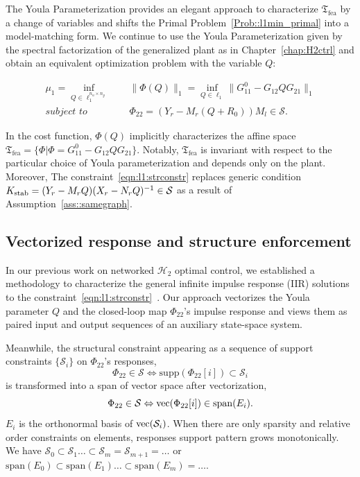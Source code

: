 The Youla Parameterization provides an elegant approach to characterize $\mathfrak{T}_{\mathrm{fea}}$ by a change of variables and shifts the Primal Problem~\ref{Prob::l1min_primal} into a model-matching form. We continue to use the Youla Parameterization given by the spectral factorization of the generalized plant as in Chapter~\ref{chap:H2ctrl} and obtain an equivalent optimization problem with the variable \(Q\):
\begin{opt}\label{Prob::l1minafterpara}
\begin{subequations}
\begin{align} 
\mu_1 = \underset{Q\in\ell_1^{n_u\times n_y}}{\inf}\ \quad &\|\Phi(Q)\|_1=\underset{Q\in\ell_1}{\inf} \|G_{11}^0 - G_{12} Q G_{21}\|_1 \\
\textit{subject to} \quad &
\Phi_{22} = (Y_r - M_r (Q + R_0)) M_l\in\mathcal{S}. \label{eqn:l1:strconstr}
\end{align}
\end{subequations}
\end{opt}
In the cost function, \(\Phi(Q)\) implicitly characterizes the affine space \(\mathfrak{T}_\mathrm{fea} = \{\Phi \vert \Phi = G_{11}^0 - G_{12} Q G_{21}\}\). Notably, $\mathfrak{T}_{\mathrm{fea}}$ is invariant with respect to the particular choice of Youla parameterization and depends only on the plant. Moreover, 
The constraint~\eqref{eqn:l1:strconstr} replaces generic condition \(K_{\mathrm{stab}} = (Y_r - M_r Q) (X_r - N_r Q)^{-1} \in \mathcal{S}\) as a result of Assumption~\ref{ass::samegraph}.

\subsection{Vectorized response and structure enforcement}
In our previous work on networked \(\mathcal{H}_2\) optimal control, we established a methodology to characterize the general infinite impulse response (IIR) solutions to the constraint~\eqref{eqn:l1:strconstr}~\cite{Yuanji2024disH2}. Our approach vectorizes the Youla parameter \(Q\) and the closed-loop map \(\Phi_{22}\)'s impulse response and views them as paired input and output sequences of an auxiliary state-space system.

Meanwhile, the structural constraint appearing as a sequence of support constraints \(\{\mathcal{S}_i\}\) on \(\Phi_{22}\)'s responses,
\[
\Phi_{22} \in \mathcal{S} \Leftrightarrow \mathrm{supp}(\Phi_{22}[i]) \subset \mathcal{S}_i
\]
is transformed into a span of vector space after vectorization,
\[
\Phi_{22} \in \mathcal{S} \Leftrightarrow {\mathrm{vec}}(\Phi_{22}[i]) \in \mathrm{span}(E_i).
\]
\(E_i\) is the orthonormal basis of \({\mathrm{vec}}(\mathcal{S}_i)\).
When there are only sparsity and relative order constraints on elements, responses support pattern grows monotonically. We have \(\mathcal{S}_0 \subset\mathcal{S}_1 \hdots \subset \mathcal{S}_m = \mathcal{S}_{m+1} = \hdots\) or \(\mathrm{span}(E_0)\subset\mathrm{span}(E_1)\hdots\subset\mathrm{span}(E_m) = \hdots\).

